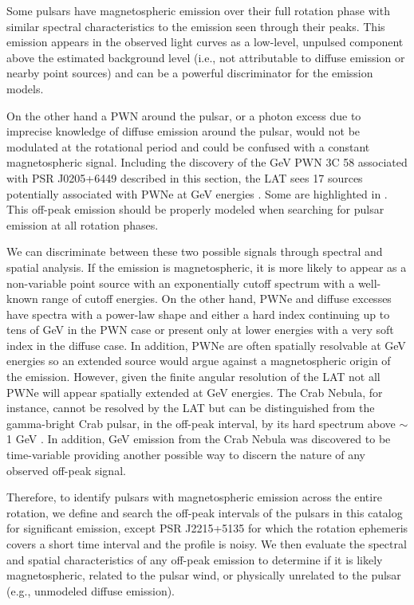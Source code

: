 Some pulsars have magnetospheric emission over their full rotation phase
with similar spectral characteristics to the emission seen through
their peaks.  This emission appears in the observed light curves as
a low-level, unpulsed component above the estimated background level
(i.e., not attributable to diffuse emission or nearby point sources)
and can be a powerful discriminator for the emission models.

On the other hand a PWN around the pulsar, or a photon excess due
to imprecise knowledge of diffuse emission around the pulsar, would
not be modulated at the rotational period and could be confused with
a constant magnetospheric signal.  Including the discovery of the GeV
PWN 3C 58 associated with PSR J0205+6449 described in this section, the
LAT sees 17 sources potentially associated with PWNe at GeV energies
\citep{acero_2013a_constraints-galactic}.  Some are highlighted in
.  This off-peak emission
should be properly modeled when searching for pulsar emission at all
rotation phases.

We can discriminate between these two possible signals through
spectral and spatial analysis.  If the emission is magnetospheric,
it is more likely to appear as a non-variable point source with
an exponentially cutoff spectrum with a well-known range of cutoff
energies.  On the other hand, PWNe and diffuse excesses have spectra
with a power-law shape and either a hard index continuing up to tens
of GeV in the PWN case or present only at lower energies with a very
soft index in the diffuse case.  In addition, PWNe are often spatially
resolvable at GeV energies \citep[e.g., Vela-X has been spatially
resolved with the LAT and \textit{AGILE} and HESS J1825$-$137 with the
LAT;][respectively]{abdo_2010c_fermi-large,pellizzoni_2010a_detection-gamma-ray,grondin_2011a_detection-pulsar}
so an extended source would argue against a magnetospheric origin of the
emission.  However, given the finite angular resolution of the LAT not all
PWNe will appear spatially extended at GeV energies.  The Crab Nebula,
for instance, cannot be resolved by the LAT but can be distinguished
from the gamma-bright Crab pulsar, in the off-peak interval, by its hard
spectrum above $\sim$1 GeV \citep{abdo_2010a_fermi-large}.  In addition,
GeV emission from the Crab Nebula was discovered to be time-variable
\citep[e.g.,][]{abdo_2011a_gamma-ray-flares} providing another possible
way to discern the nature of any observed off-peak signal.


Therefore, to identify pulsars with magnetospheric emission across
the entire rotation, we define and search the off-peak intervals
of the pulsars in this catalog for significant emission, except PSR
J2215+5135 for which the rotation ephemeris covers a short time interval
and the profile is noisy.  We then evaluate the spectral and spatial
characteristics of any off-peak emission to determine if it is likely
magnetospheric, related to the pulsar wind, or physically unrelated to
the pulsar (e.g., unmodeled diffuse emission).
